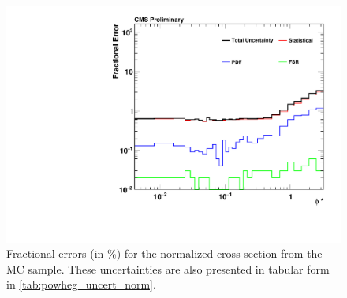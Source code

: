 \begin{figure}[!p]
    \centering
    \includegraphics[width=\textwidth]{figures/powheg_uncertainty_normalized.pdf}
    \caption[
        Fractional errors (in \%) for the normalized cross section from the
        \POWHEG MC sample.
    ]{
        Fractional errors (in \%) for the normalized cross section from the
        \POWHEG MC sample. These uncertainties are also presented in tabular
        form in \cref{tab:powheg_uncert_norm}.
    }
    \label{fig:powheg_uncert_norm}
\end{figure}
